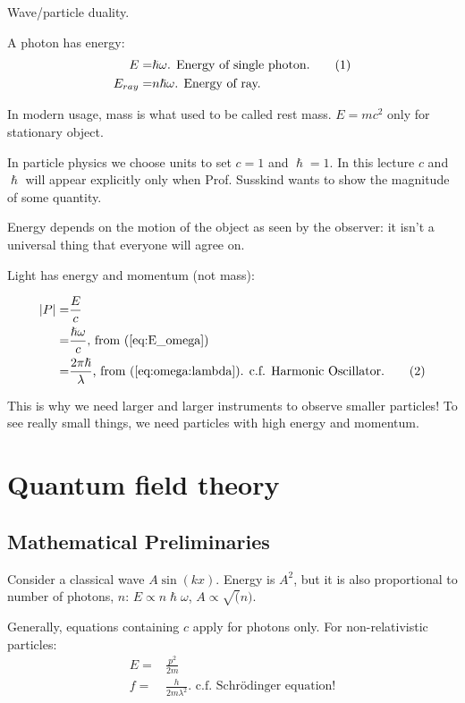 \documentclass[]{article}
\newcommand\numberthis{\addtocounter{equation}{1}\tag{\theequation}}
\begin{document}
Wave/particle duality.

A photon has energy:
\begin{align*}
E=&\hslash \omega \text{. Energy of single photon.} \numberthis\label{eq:E_omega}\\
E_{ray}=&n \hslash \omega \text{. Energy of ray.}
\end{align*}
 

In modern usage, mass is what used to be called rest mass. $E = m c^2$ only for stationary object.

In particle physics we choose units to set $c=1$ and $\hslash=1$. In this lecture $c$ and $\hslash$ will appear explicitly only when Prof. Susskind wants to show the magnitude of some quantity.

Energy depends on the motion of the object as seen by the observer: it isn't a universal thing that everyone will agree on.

Light has energy and momentum (not mass): 

\begin{align*}
\left|P\right|=&\frac{E}{c} \\
=&\frac{\hslash \omega}{c} \text{, from (\ref{eq:E_omega})}\\
=& \frac{2 \pi \hslash}{\lambda} \text{, from (\ref{eq:omega:lambda}). c.f. Harmonic Oscillator.}\numberthis\label{eq:P:lambda}
\end{align*}

This is why we need larger and larger instruments to observe smaller particles!
To see really small things, we need particles with high energy and momentum.


\section{Quantum field theory}

\subsection{Mathematical Preliminaries}

Consider a classical wave $A \sin(kx)$. Energy is $A^2$, but it is also proportional to number of photons, $n$: $E \propto n \hslash \omega$, $A \propto \sqrt(n)$.

Generally, equations containing $c$ apply for photons only. For non-relativistic particles:
\begin{align*}
E=&\frac{p^2}{2m}\\
f =& \frac{h}{2 m \lambda^2} \text{. c.f. Schr\"odinger equation!}
\end{align*}
\end{document}
